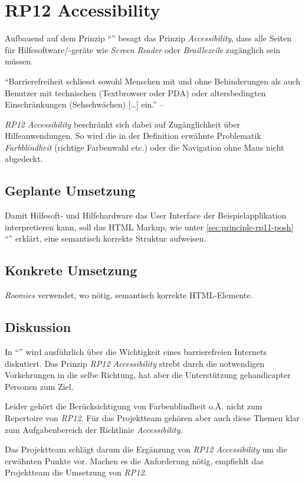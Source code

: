 \section{RP12 Accessibility}
\label{sec:principle-rp12-accessibility}
Aufbauend auf dem Prinzip ``'' besagt das Prinzip \emph{Accessibility}, dass alle Seiten für Hilfesoftware/-geräte wie \emph{Screen Reader} oder \emph{Braillezeile} zugänglich sein müssen.


``Barrierefreiheit schliesst sowohl Menschen mit und ohne Behinderungen als auch Benutzer mit technischen (Textbrowser oder PDA) oder altersbedingten Einschränkungen (Sehschwächen) [\ldots] ein.'' -- \cite{BarrierefreiesInternet}

\emph{RP12 Accessibility} beschränkt sich dabei auf Zugänglichkeit über Hilfeanwendungen. So wird die in der Definition erwähnte Problematik \emph{Farbblindheit} (richtige Farbenwahl etc.) oder die Navigation ohne Maus nicht abgedeckt.

\subsection*{Geplante Umsetzung}
Damit Hilfesoft- und Hilfehardware das User Interface der Beispielapplikation interpretieren kann, soll das HTML Markup, wie unter \ref{sec:principle-rp11-posh} ``'' erklärt, eine semantisch korrekte Struktur aufweisen.

\subsection*{Konkrete Umsetzung}

\emph{Roomies} verwendet, wo nötig, semantisch korrekte HTML-Elemente.

\subsection*{Diskussion}
In ``'' wird ausführlich über die Wichtigkeit eines barrierefreien Internets diskutiert. Das Prinzip \emph{RP12 Accessibility} strebt durch die notwendigen Vorkehrungen in die selbe Richtung, hat aber die Unterstützung gehandicapter Personen zum Ziel.

Leider gehört die Berücksichtigung von Farbenblindheit o.Ä. nicht zum Repertoire von \emph{RP12}. Für das Projektteam gehören aber auch diese Themen klar zum Aufgabenbereich der Richtlinie \emph{Accessibility}.

Das Projektteam schlägt darum die Ergänzung von \emph{RP12 Accessibility} um die erwähnten Punkte vor. Machen es die Anforderung nötig, empfiehlt das Projektteam die Umsetzung von \emph{RP12}.